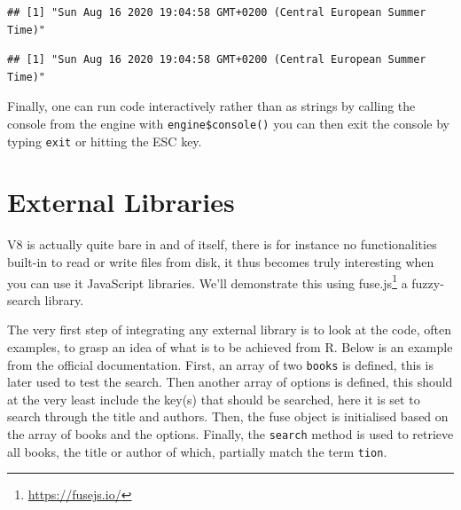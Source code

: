 \documentclass[
]{krantz}
\makeatletter
\newenvironment{Shaded}{\begin{snugshade}}{\end{snugshade}}
\newcommand{\CommentTok}[1]{\textcolor[rgb]{0.37,0.37,0.37}{\textit{#1}}}
\newcommand{\KeywordTok}[1]{\textcolor[rgb]{0.27,0.27,0.27}{\textbf{#1}}}
\newcommand{\NormalTok}[1]{#1}
\newcommand{\OperatorTok}[1]{\textcolor[rgb]{0.43,0.43,0.43}{\textbf{#1}}}
\newcommand{\StringTok}[1]{\textcolor[rgb]{0.5,0.5,0.5}{#1}}
\renewcommand{\href}[2]{#2\footnote{\url{#1}}}
\newenvironment{kframe}{%
\medskip{}
\setlength{\fboxsep}{.8em}
 \def\at@end@of@kframe{}%
 \ifinner\ifhmode%
  \def\at@end@of@kframe{\end{minipage}}%
  \begin{minipage}{\columnwidth}%
 \fi\fi%
 \def\FrameCommand##1{\hskip\@totalleftmargin \hskip-\fboxsep
 \colorbox{shadecolor}{##1}\hskip-\fboxsep
     \hskip-\linewidth \hskip-\@totalleftmargin \hskip\columnwidth}%
 \MakeFramed {\advance\hsize-\width
   \@totalleftmargin\z@ \linewidth\hsize
   \@setminipage}}%
 {\par\unskip\endMakeFramed%
 \at@end@of@kframe}
\renewenvironment{Shaded}{\begin{kframe}}{\end{kframe}}
\makeatother
\begin{document}
\begin{Shaded}
\end{Shaded}

\begin{verbatim}
## [1] "Sun Aug 16 2020 19:04:58 GMT+0200 (Central European Summer Time)"
\end{verbatim}

\begin{Shaded}
\end{Shaded}

\begin{verbatim}
## [1] "Sun Aug 16 2020 19:04:58 GMT+0200 (Central European Summer Time)"
\end{verbatim}

Finally, one can run code interactively rather than as strings by calling the console from the engine with \texttt{engine\$console()} you can then exit the console by typing \texttt{exit} or hitting the ESC key.

\hypertarget{external-libraries}{%
\section{External Libraries}\label{external-libraries}}

V8 is actually quite bare in and of itself, there is for instance no functionalities built-in to read or write files from disk, it thus becomes truly interesting when you can use it JavaScript libraries. We'll demonstrate this using \href{https://fusejs.io/}{fuse.js} a fuzzy-search library.

The very first step of integrating any external library is to look at the code, often examples, to grasp an idea of what is to be achieved from R. Below is an example from the official documentation. First, an array of two \texttt{books} is defined, this is later used to test the search. Then another array of options is defined, this should at the very least include the key(s) that should be searched, here it is set to search through the title and authors. Then, the fuse object is initialised based on the array of books and the options. Finally, the \texttt{search} method is used to retrieve all books, the title or author of which, partially match the term \texttt{tion}.
\end{document}
